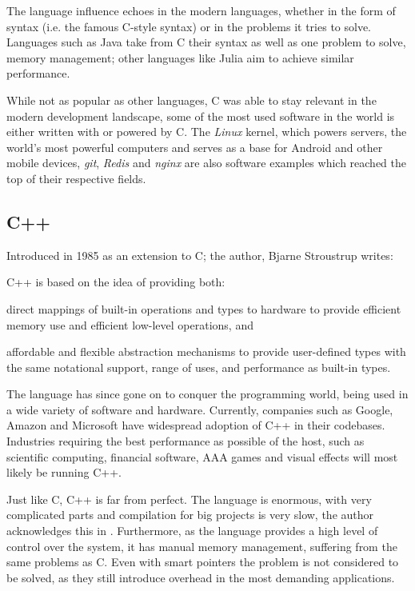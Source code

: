 The language influence echoes in the modern languages,
whether in the form of syntax (i.e. the famous C-style syntax) or in the problems it tries to solve.
Languages such as Java take from C their syntax as well as one problem to solve, memory management;
other languages like Julia \autocite{Bezanson2017} aim to achieve similar performance.

While not as popular as other languages, C was able to stay relevant in the modern development landscape,
some of the most used software in the world is either written with or powered by C.
The \emph{Linux} kernel, which powers servers, the world's most powerful computers
and serves as a base for Android and other mobile devices,
\emph{git}, \emph{Redis} and \emph{nginx} are also software examples which reached the top of their respective fields.

\subsection{C++}

Introduced in 1985 as an extension to C; the author, Bjarne Stroustrup writes:

\begin{displayquote}
    C++ is based on the idea of providing both:
    \begin{compactitem}
        \item direct mappings of built-in operations and types to hardware to provide efficient memory use and efficient low-level operations, and
        \item affordable and flexible abstraction mechanisms to provide user-defined types with the same notational support, range of uses, and performance as built-in types.
    \end{compactitem}
\end{displayquote}

The language has since gone on to conquer the programming world, being used in a wide variety of software and hardware.
Currently, companies such as Google, Amazon and Microsoft have widespread adoption of C++ in their codebases.
Industries requiring the best performance as possible of the host, such as scientific computing,
financial software, AAA games and visual effects will most likely be running C++.

Just like C, C++ is far from perfect.
The language is enormous, with very complicated parts  and compilation for big projects is very slow,
the author acknowledges this in \autocite{Torre2014}.
Furthermore, as the language provides a high level of control over the system, it has manual memory management,
suffering from the same problems as C.
Even with smart pointers  the problem is not considered to be solved,
as they still introduce overhead in the most demanding applications.


